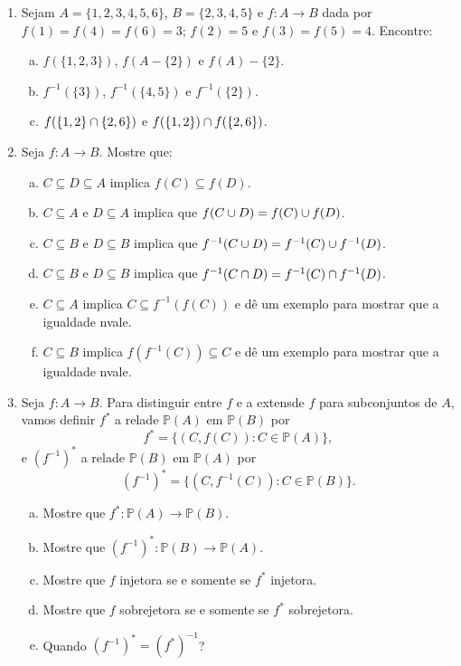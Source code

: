 \begin{enumerate}[{\bf 1.}]

\item Sejam $A=\{1,2,3,4,5,6\}$, $B=\{2,3,4,5\}$ e $f:A\to B$ dada por $f(1)=f(4)=f(6)=3$; $f(2)=5$ e $f(3)=f(5)=4$. Encontre:
\begin{enumerate}[a)]
\item $f(\{1,2,3\})$, $f(A-\{2\})$ e $f(A)-\{2\}$.
\item $f^{-1}(\{3\})$, $f^{-1}(\{4,5\})$ e $f^{-1}(\{2\})$.
\item $f(\{1,2\}\cap \{2,6\})$ e $f(\{1,2\})\cap f(\{2,6\})$. 
\end{enumerate}

\item Seja $f:A\to B$. Mostre que:
\begin{enumerate}[a)]
\item $C\subseteq D\subseteq A$ implica $f(C)\subseteq f(D)$.
\item $C\subseteq A$ e $D \subseteq A$ implica que $f(C\cup D)=f(C)\cup f(D)$. 
\item $C\subseteq B$ e $D \subseteq B$ implica que $f^{-1}(C\cup D)=f^{-1}(C)\cup f^{-1}(D)$.
\item $C\subseteq B$ e $D \subseteq B$ implica que $f^{-1}(C\cap D)=f^{-1}(C)\cap f^{-1}(D)$.
\item $C\subseteq A$ implica $C\subseteq f^{-1}(f(C))$ e d\^e um exemplo para mostrar que a igualdade n\ao vale.
\item $C\subseteq B$ implica $f(f^{-1}(C))\subseteq C$ e d\^e um exemplo para mostrar que a igualdade n\ao vale. 
\end{enumerate}

\item Seja $f:A\to B$. Para distinguir entre $f$ e a extens\ao de $f$ para subconjuntos de $A$, vamos definir $f^{\ast}$ a rela\cao de $\mathbb{P}(A)$ em $\mathbb{P}(B)$ por
\[
f^{\ast}=\{(C,f(C)): C\in \mathbb{P}(A)\},
\]
e $(f^{-1})^{\ast}$ a rela\cao de $\mathbb{P}(B)$ em $\mathbb{P}(A)$ por
\[
(f^{-1})^{\ast}=\{(C,f^{-1}(C)): C\in \mathbb{P}(B)\}.
\]
\begin{enumerate}[a)]
\item Mostre que $f^{\ast}:\mathbb{P}(A)\to\mathbb{P}(B)$.
\item Mostre que $(f^{-1})^{\ast}:\mathbb{P}(B)\to\mathbb{P}(A)$.
\item Mostre que $f$ injetora se e somente se $f^{\ast}$ injetora.
\item Mostre que $f$ sobrejetora se e somente se $f^{\ast}$ sobrejetora.
\item Quando $(f^{-1})^{\ast}=(f^{\ast})^{-1}$?  
\end{enumerate}


\end{enumerate}
